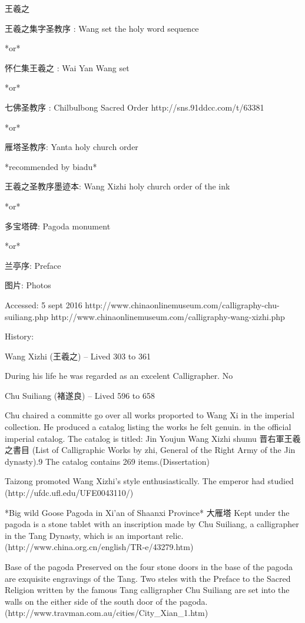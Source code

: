 王羲之

王羲之集字圣教序 : Wang set the holy word sequence

*or*

怀仁集王羲之 : Wai Yan Wang set

*or*

七佛圣教序 : Chilbulbong Sacred Order  http://sns.91ddcc.com/t/63381

*or*

雁塔圣教序: Yanta holy church order

*recommended by biadu*

王羲之圣教序墨迹本: Wang Xizhi holy church order of the ink

*or*

多宝塔碑: Pagoda monument

*or*

兰亭序: Preface

图片: Photos

Accessed:  5 sept 2016
http://www.chinaonlinemuseum.com/calligraphy-chu-suiliang.php 
http://www.chinaonlinemuseum.com/calligraphy-wang-xizhi.php


History:

Wang Xizhi (王羲之) -- Lived 303 to 361

During his life he was regarded as an excelent Calligrapher.
No


Chu Suiliang (褚遂良) -- Lived 596 to 658


Chu chaired a committe go over all works proported to Wang Xi in the imperial collection.  He produced a catalog listing the works he felt genuin. in the official imperial catalog.  The catalog is titled: 
Jin Youjun Wang Xizhi shumu 晋右軍王羲之書目 (List of Calligraphic Works by zhi, General of the Right Army of the Jin dynasty).9 The catalog contains 269 items.(Dissertation)

Taizong promoted Wang Xizhi's style enthusiastically.  The emperor had studied 
(http://ufdc.ufl.edu/UFE0043110/)







*Big wild Goose Pagoda in Xi'an of Shaanxi Province* 大雁塔
Kept under the pagoda is a stone tablet with an inscription made by Chu Suiliang, a calligrapher in the Tang Dynasty, which is an important relic. (http://www.china.org.cn/english/TR-e/43279.htm)

Base of the pagoda
Preserved on the four stone doors in the base of the pagoda are exquisite engravings of the Tang. Two steles with the Preface to the Sacred Religion written by the famous Tang calligrapher Chu Suiliang are set into the walls on the either side of the south door of the pagoda. (http://www.travman.com.au/cities/City_Xian_1.htm)

